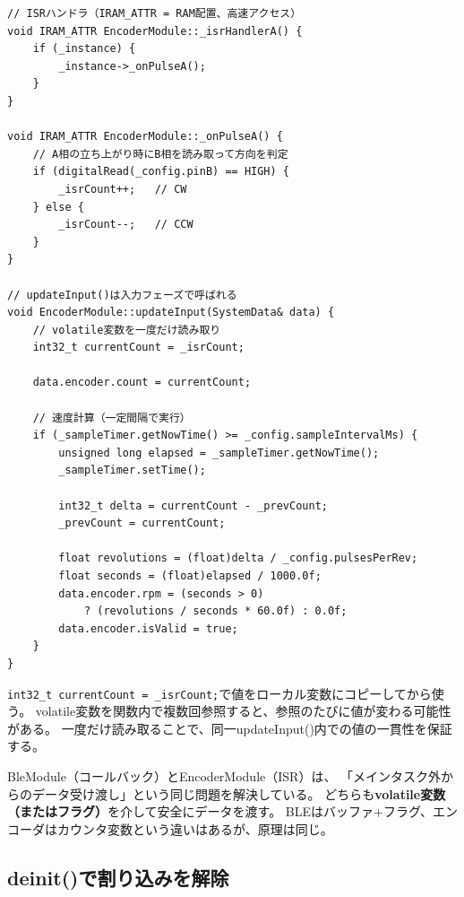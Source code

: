 \begin{lstlisting}[style=cppstyle, caption={EncoderModule.cpp — ISRとupdate()}]
// ISRハンドラ（IRAM_ATTR = RAM配置、高速アクセス）
void IRAM_ATTR EncoderModule::_isrHandlerA() {
    if (_instance) {
        _instance->_onPulseA();
    }
}

void IRAM_ATTR EncoderModule::_onPulseA() {
    // A相の立ち上がり時にB相を読み取って方向を判定
    if (digitalRead(_config.pinB) == HIGH) {
        _isrCount++;   // CW
    } else {
        _isrCount--;   // CCW
    }
}

// updateInput()は入力フェーズで呼ばれる
void EncoderModule::updateInput(SystemData& data) {
    // volatile変数を一度だけ読み取り
    int32_t currentCount = _isrCount;

    data.encoder.count = currentCount;

    // 速度計算（一定間隔で実行）
    if (_sampleTimer.getNowTime() >= _config.sampleIntervalMs) {
        unsigned long elapsed = _sampleTimer.getNowTime();
        _sampleTimer.setTime();

        int32_t delta = currentCount - _prevCount;
        _prevCount = currentCount;

        float revolutions = (float)delta / _config.pulsesPerRev;
        float seconds = (float)elapsed / 1000.0f;
        data.encoder.rpm = (seconds > 0)
            ? (revolutions / seconds * 60.0f) : 0.0f;
        data.encoder.isValid = true;
    }
}
\end{lstlisting}

\begin{pointbox}[volatile変数を一度だけ読み取る]
\texttt{int32\_t currentCount = \_isrCount;}で値をローカル変数にコピーしてから使う。
volatile変数を関数内で複数回参照すると、参照のたびに値が変わる可能性がある。
一度だけ読み取ることで、同一updateInput()内での値の一貫性を保証する。
\end{pointbox}

\begin{pointbox}[BleModuleとの共通パターン]
BleModule（コールバック）とEncoderModule（ISR）は、
「メインタスク外からのデータ受け渡し」という同じ問題を解決している。
どちらも\textbf{volatile変数（またはフラグ）}を介して安全にデータを渡す。
BLEはバッファ+フラグ、エンコーダはカウンタ変数という違いはあるが、原理は同じ。
\end{pointbox}

\subsection{deinit()で割り込みを解除}

